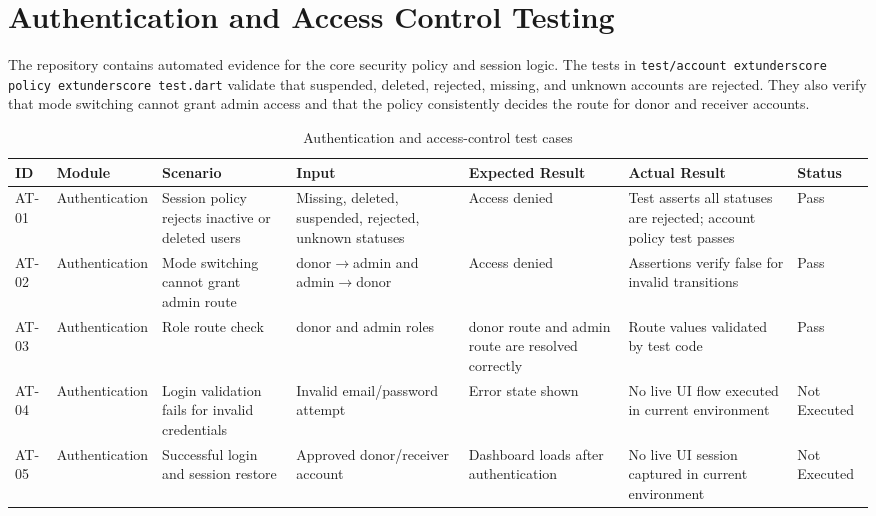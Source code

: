 
\section{Authentication and Access Control Testing}

The repository contains automated evidence for the core security policy and session logic. The tests in \texttt{test/account	extunderscore policy	extunderscore test.dart} validate that suspended, deleted, rejected, missing, and unknown accounts are rejected. They also verify that mode switching cannot grant admin access and that the policy consistently decides the route for donor and receiver accounts.

\begin{table}[H]
\centering
\caption{Authentication and access-control test cases}
\begin{tabularx}{\textwidth}{|p{1.6cm}|p{2.7cm}|X|X|X|p{1.6cm}|p{2.5cm}|}
\hline
\textbf{ID} & \textbf{Module} & \textbf{Scenario} & \textbf{Input} & \textbf{Expected Result} & \textbf{Actual Result} & \textbf{Status} \\
\hline
AT-01 & Authentication & Session policy rejects inactive or deleted users & Missing, deleted, suspended, rejected, unknown statuses & Access denied & Test asserts all statuses are rejected; account policy test passes & Pass \\
\hline
AT-02 & Authentication & Mode switching cannot grant admin route & donor$\rightarrow$admin and admin$\rightarrow$donor & Access denied & Assertions verify false for invalid transitions & Pass \\
\hline
AT-03 & Authentication & Role route check & donor and admin roles & donor route and admin route are resolved correctly & Route values validated by test code & Pass \\
\hline
AT-04 & Authentication & Login validation fails for invalid credentials & Invalid email/password attempt & Error state shown & No live UI flow executed in current environment & Not Executed \\
\hline
AT-05 & Authentication & Successful login and session restore & Approved donor/receiver account & Dashboard loads after authentication & No live UI session captured in current environment & Not Executed \\
\hline
\end{tabularx}
\end{table}

